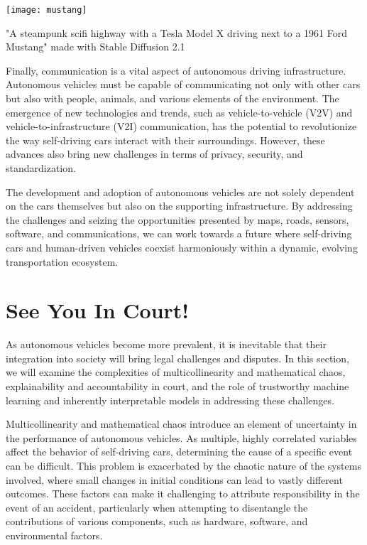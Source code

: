 \begin{marginfigure}[-5.5cm]
        \texttt{[image: mustang]}
        \caption{"A steampunk scifi highway with a Tesla Model X driving next to a 1961 Ford Mustang" made with Stable Diffusion 2.1}
\end{marginfigure}

Finally, communication is a vital aspect of autonomous driving infrastructure. Autonomous vehicles must be capable of communicating not only with other cars but also with people, animals, and various elements of the environment. The emergence of new technologies and trends, such as vehicle-to-vehicle (V2V) and vehicle-to-infrastructure (V2I) communication, has the potential to revolutionize the way self-driving cars interact with their surroundings. However, these advances also bring new challenges in terms of privacy, security, and standardization.

The development and adoption of autonomous vehicles are not solely dependent on the cars themselves but also on the supporting infrastructure. By addressing the challenges and seizing the opportunities presented by maps, roads, sensors, software, and communications, we can work towards a future where self-driving cars and human-driven vehicles coexist harmoniously within a dynamic, evolving transportation ecosystem.

\section{See You In Court!}

As autonomous vehicles become more prevalent, it is inevitable that their integration into society will bring legal challenges and disputes. In this section, we will examine the complexities of multicollinearity and mathematical chaos, explainability and accountability in court, and the role of trustworthy machine learning and inherently interpretable models in addressing these challenges.

Multicollinearity and mathematical chaos introduce an element of uncertainty in the performance of autonomous vehicles. As multiple, highly correlated variables affect the behavior of self-driving cars, determining the cause of a specific event can be difficult. This problem is exacerbated by the chaotic nature of the systems involved, where small changes in initial conditions can lead to vastly different outcomes. These factors can make it challenging to attribute responsibility in the event of an accident, particularly when attempting to disentangle the contributions of various components, such as hardware, software, and environmental factors.

